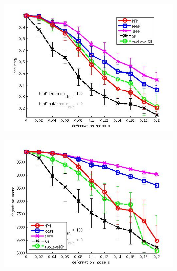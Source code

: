 \begin{figure}[h] 
	\begin{subfigure}[b]{0.3\textwidth}
		\centering
		\includegraphics[scale=0.25]{"chapter3/fig/SyntheticTest/ver4.3.2/deformation/accuracy_avg10t"} 
	\end{subfigure}%
	\begin{subfigure}[b]{0.3\textwidth}
		\centering
		\includegraphics[scale=0.25]{"chapter3/fig/SyntheticTest/ver4.3.2/deformation/score_avg10t"} 
	\end{subfigure} 
	\begin{subfigure}[b]{0.3\textwidth}
		\centering

\end{subfigure}
\end{figure}

